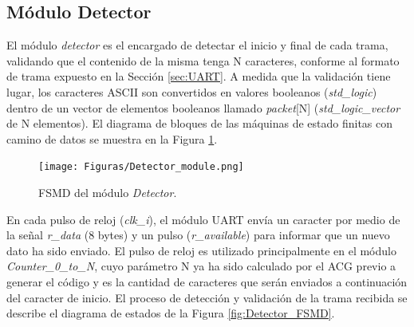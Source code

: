 \subsection{Módulo Detector}

El módulo \textit{detector} es el encargado de detectar el inicio y final de cada trama, validando que el contenido de la misma tenga N caracteres, conforme al formato de trama expuesto en la Sección \ref{sec:UART}. A medida que la validación tiene lugar, los caracteres ASCII son convertidos en valores booleanos (\textit{std\_logic}) dentro de un vector de elementos booleanos llamado \textit{packet}[N] (\textit{std\_logic\_vector} de N elementos). El diagrama de bloques de las máquinas de estado finitas con camino de datos se muestra en la Figura \ref{fig:Detector_module}.

\begin{figure}[H]
	\centering
	\texttt{[image: Figuras/Detector\_module.png]}
	\centering\caption{FSMD del módulo \textit{Detector}.}
	\label{fig:Detector_module}
\end{figure}

En cada pulso de reloj (\textit{clk\_i}), el módulo UART envía un caracter por medio de la señal \textit{r\_data} (8 bytes) y un pulso (\textit{r\_available}) para informar que un nuevo dato ha sido enviado. El pulso de reloj es utilizado principalmente en el módulo \textit{Counter\_0\_to\_N}, cuyo parámetro N ya ha sido calculado por el ACG previo a generar el código y es la cantidad de caracteres que serán enviados a continuación del caracter de inicio. El proceso de detección y validación de la trama recibida se describe el diagrama de estados de la Figura \ref{fig:Detector_FSMD}.

